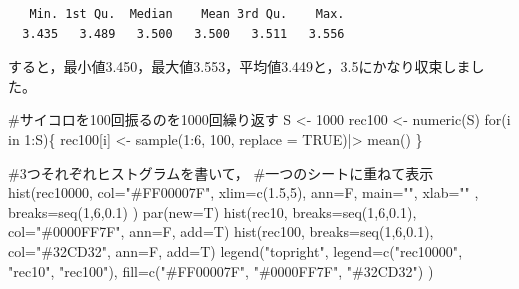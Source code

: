 \documentclass[
  letterpaper,
  DIV=11,
  numbers=noendperiod]{scrreprt}
\newenvironment{Shaded}{\begin{snugshade}}{\end{snugshade}}
\newcommand{\AttributeTok}[1]{\textcolor[rgb]{0.40,0.45,0.13}{#1}}
\newcommand{\CommentTok}[1]{\textcolor[rgb]{0.37,0.37,0.37}{#1}}
\newcommand{\ConstantTok}[1]{\textcolor[rgb]{0.56,0.35,0.01}{#1}}
\newcommand{\ControlFlowTok}[1]{\textcolor[rgb]{0.00,0.23,0.31}{#1}}
\newcommand{\DecValTok}[1]{\textcolor[rgb]{0.68,0.00,0.00}{#1}}
\newcommand{\FloatTok}[1]{\textcolor[rgb]{0.68,0.00,0.00}{#1}}
\newcommand{\FunctionTok}[1]{\textcolor[rgb]{0.28,0.35,0.67}{#1}}
\newcommand{\NormalTok}[1]{\textcolor[rgb]{0.00,0.23,0.31}{#1}}
\newcommand{\OtherTok}[1]{\textcolor[rgb]{0.00,0.23,0.31}{#1}}
\newcommand{\SpecialCharTok}[1]{\textcolor[rgb]{0.37,0.37,0.37}{#1}}
\newcommand{\StringTok}[1]{\textcolor[rgb]{0.13,0.47,0.30}{#1}}
\begin{document}
\begin{verbatim}
   Min. 1st Qu.  Median    Mean 3rd Qu.    Max. 
  3.435   3.489   3.500   3.500   3.511   3.556 
\end{verbatim}

すると，最小値3.450，最大値3.553，平均値3.449と，3.5にかなり収束しました。

\begin{Shaded}
\begin{Highlighting}[]
\CommentTok{\#サイコロを100回振るのを1000回繰り返す}
\NormalTok{S }\OtherTok{\textless{}{-}} \DecValTok{1000}
\NormalTok{rec100 }\OtherTok{\textless{}{-}} \FunctionTok{numeric}\NormalTok{(S)}
\ControlFlowTok{for}\NormalTok{(i }\ControlFlowTok{in} \DecValTok{1}\SpecialCharTok{:}\NormalTok{S)\{}
\NormalTok{  rec100[i] }\OtherTok{\textless{}{-}} \FunctionTok{sample}\NormalTok{(}\DecValTok{1}\SpecialCharTok{:}\DecValTok{6}\NormalTok{, }\DecValTok{100}\NormalTok{, }\AttributeTok{replace =} \ConstantTok{TRUE}\NormalTok{)}\SpecialCharTok{|\textgreater{}}
    \FunctionTok{mean}\NormalTok{()}
\NormalTok{\}}

\CommentTok{\#3つそれぞれヒストグラムを書いて，}
\CommentTok{\#一つのシートに重ねて表示}
\FunctionTok{hist}\NormalTok{(rec10000, }
     \AttributeTok{col=}\StringTok{"\#FF00007F"}\NormalTok{, }
     \AttributeTok{xlim=}\FunctionTok{c}\NormalTok{(}\FloatTok{1.5}\NormalTok{,}\DecValTok{5}\NormalTok{),}
     \AttributeTok{ann=}\NormalTok{F, }
     \AttributeTok{main=}\StringTok{""}\NormalTok{, }
     \AttributeTok{xlab=}\StringTok{""}\NormalTok{ ,}
     \AttributeTok{breaks=}\FunctionTok{seq}\NormalTok{(}\DecValTok{1}\NormalTok{,}\DecValTok{6}\NormalTok{,}\FloatTok{0.1}\NormalTok{)}
\NormalTok{     )}
\FunctionTok{par}\NormalTok{(}\AttributeTok{new=}\NormalTok{T)}
\FunctionTok{hist}\NormalTok{(rec10, }
     \AttributeTok{breaks=}\FunctionTok{seq}\NormalTok{(}\DecValTok{1}\NormalTok{,}\DecValTok{6}\NormalTok{,}\FloatTok{0.1}\NormalTok{),}
     \AttributeTok{col=}\StringTok{"\#0000FF7F"}\NormalTok{,}
     \AttributeTok{ann=}\NormalTok{F, }
     \AttributeTok{add=}\NormalTok{T)}
\FunctionTok{hist}\NormalTok{(rec100, }
     \AttributeTok{breaks=}\FunctionTok{seq}\NormalTok{(}\DecValTok{1}\NormalTok{,}\DecValTok{6}\NormalTok{,}\FloatTok{0.1}\NormalTok{),}
     \AttributeTok{col=}\StringTok{"\#32CD32"}\NormalTok{,}
     \AttributeTok{ann=}\NormalTok{F, }
     \AttributeTok{add=}\NormalTok{T)}
\FunctionTok{legend}\NormalTok{(}\StringTok{"topright"}\NormalTok{, }
       \AttributeTok{legend=}\FunctionTok{c}\NormalTok{(}\StringTok{"rec10000"}\NormalTok{, }
                \StringTok{"rec10"}\NormalTok{, }
                \StringTok{"rec100"}\NormalTok{),}
       \AttributeTok{fill=}\FunctionTok{c}\NormalTok{(}\StringTok{"\#FF00007F"}\NormalTok{, }
              \StringTok{"\#0000FF7F"}\NormalTok{,}
              \StringTok{"\#32CD32"}\NormalTok{)}
\NormalTok{       )}
\end{Highlighting}
\end{Shaded}
\end{document}
